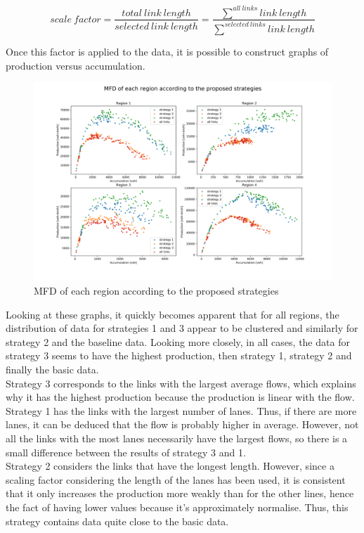 \documentclass[a4paper, 12pt,oneside]{article}
\begin{document}
\begin{equation}
       scale~factor =  \frac{total~link~length}{selected~link~length} = \frac{\sum^{all~links} link~length}{\sum^{selected~links} link~length}
    \label{ratio}
\end{equation}

Once this factor is applied to the data, it is possible to construct graphs of production versus accumulation. 

\begin{figure}[H]
    \begin{center}
        \includegraphics[width=18cm]{Images/step5plt.png}
        \caption{MFD of each region according to the proposed strategies}
        \label{MFD of each region according to the proposed strategies}
    \end{center}
\end{figure}

Looking at these graphs, it quickly becomes apparent that for all regions, the distribution of data for strategies 1 and 3 appear to be clustered and similarly for strategy 2 and the baseline data. Looking more closely, in all cases, the data for strategy 3 seems to have the highest production, then strategy 1, strategy 2 and finally the basic data.\\ Strategy 3 corresponds to the links with the largest average flows, which explains why it has the highest production because the production is linear with the flow.
\\Strategy 1 has the links with the largest number of lanes. Thus, if there are more lanes, it can be deduced that the flow is probably higher in average.  However, not all the links with the most lanes necessarily have the largest flows, so there is a small difference between the results of strategy 3 and 1.\\
Strategy 2 considers the links that have the longest length. However, since a scaling factor considering the length of the lanes has been used, it is consistent that it only increases the production more weakly than for the other lines, hence the fact of having lower values because it's approximately normalise. Thus, this strategy contains data quite close to the basic data.\\
\end{document}
